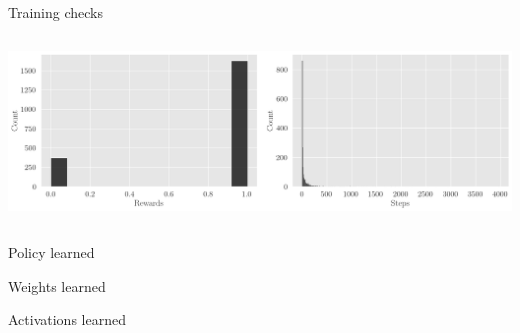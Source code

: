 \documentclass[bigger]{beamer}
\begin{document}
\begin{frame}[label={sec:org4244539}]{Training checks}
\begin{columns}
\begin{column}[c]{0.5\columnwidth}
\begin{center}
\end{center}
\begin{center}
\includegraphics[width=\textwidth]{img/steps-and-rewards-distrib.png}
\end{center}
\end{column}
\end{columns}
\end{frame}
\begin{frame}[label={sec:org59b6a3d}]{Policy learned}
\end{frame}
\begin{frame}[label={sec:org933e814}]{Weights learned}
\end{frame}
\begin{frame}[label={sec:org0697929}]{Activations learned}
\end{frame}
\end{document}
